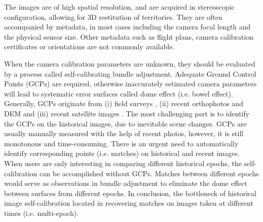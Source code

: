 The images are of high spatial resolution, and are acquired in stereoscopic configuration, allowing for 3D restitution of territories. 
They are often accompanied by metadata, in most cases including the camera focal length and the physical sensor size. Other metadata such as flight plans, camera calibration certificates or orientations are not commonly available. 
\par
When the camera calibration parameters are unknown, they should be evaluated by a process called self-calibrating bundle adjustment. Adequate Ground Control Points (GCPs) are required, otherwise inaccurately estimated camera parameters will lead to systematic error surfaces called dome effect (i.e. bowel effect).
Generally, GCPs originate from (i) field surveys \cite{micheletti2015application,walstra2004time,cardenal2006use}, (ii) recent orthophotos and DEM \cite{nurminen2015automation,ellis2006measuring,fox2008unlocking} and (iii) recent satellite images \cite{ellis2006measuring,ford2013shoreline}. The most challenging part is to identify the GCPs on the historical images, due to inevitable scene changes. GCPs are usually manually measured with the help of recent photos, however, it is still monotonous and time-consuming. 
There is an urgent need to automatically identify corresponding points (i.e. matches) on historical and recent images.\\
When users are only interesting in comparing different historical epochs, the self-calibration can be accomplished without GCPs. Matches between different epochs would serve as observations in bundle adjustment to eliminate the dome effect between surfaces from different epochs. In conclusion, the bottleneck of historical image self-calibration located in recovering matches on images taken at different times (i.e. multi-epoch).


